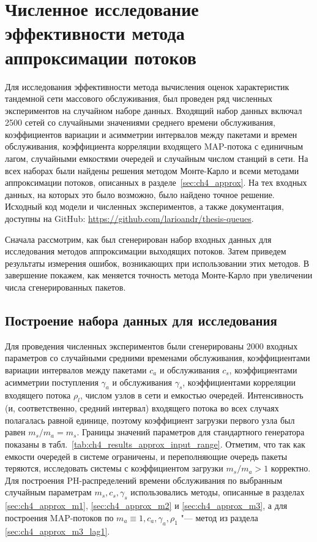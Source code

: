 \section{Численное исследование эффективности метода аппроксимации потоков}

Для исследования эффективности метода вычисления оценок характеристик тандемной сети массового обслуживания, был проведен ряд численных экспериментов на случайном наборе данных. Входящий набор данных включал 2500 сетей со случайными значениями среднего времени обслуживания, коэффициентов вариации и асимметрии интервалов между пакетами и времен обслуживания, коэффициента корреляции входящего MAP-потока с единичным лагом, случайными емкостями очередей и случайным числом станций в сети. На всех наборах были найдены решения методом Монте-Карло и всеми методами аппроксимации потоков, описанных в разделе~\ref{sec:ch4_approx}. На тех входных данных, на которых это было возможно, было найдено точное решение. Исходный код модели и численных экспериментов, а также документация, доступны на GitHub: \url{https://github.com/larioandr/thesis-queues}.

Сначала рассмотрим, как был сгенерирован набор входных данных для исследования методов аппроксимации выходящих потоков. Затем приведем результаты измерения ошибок, возникающих при использовании этих методов. В завершение покажем, как меняется точность метода Монте-Карло при увеличении числа сгенерированных пакетов.


\subsection{Построение набора данных для исследования}

Для проведения численных экспериментов были сгенерированы 2000 входных параметров со случайными средними временами обслуживания, коэффициентами вариации интервалов между пакетами $c_a$ и обслуживания $c_s$, коэффициентами асимметрии поступления $\gamma_a$ и обслуживания $\gamma_s$, коэффициентами корреляции входящего потока $\rho_l$, числом узлов в сети и емкостью очередей. Интенсивность (и, соответственно, средний интервал) входящего потока во всех случаях полагалась равной единице, поэтому коэффициент загрузки первого узла был равен $m_s / m_a = m_s$. Границы значений параметров для стандартного генератора показаны в табл.~\ref{tab:ch4_results_approx_input_range}. Отметим, что так как емкости очередей в системе ограничены, и переполняющие очередь пакеты теряются, исследовать системы с коэффициентом загрузки $m_s / m_a > 1$ корректно. Для построения PH-распределений времени обслуживания по выбранным случайным параметрам $m_s, c_s, \gamma_s$ использовались методы, описанные в разделах \ref{sec:ch4_approx_m1}, \ref{sec:ch4_approx_m2} и \ref{sec:ch4_approx_m3}, а для построения MAP-потоков по $m_a \equiv 1, c_a, \gamma_a, \rho_1$ "--- метод из раздела \ref{sec:ch4_approx_m3_lag1}.

